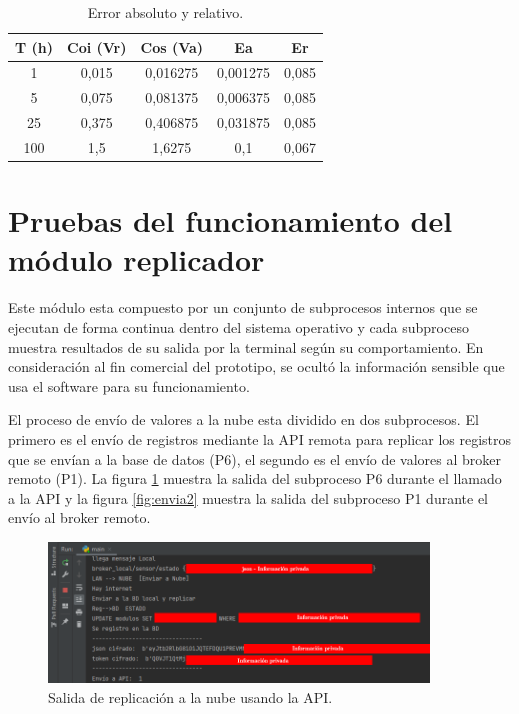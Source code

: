 \vspace{0.5cm}
\begin{table}[h]
	\centering
	\caption[Error absoluto y relativo]{Error absoluto y relativo.}
	\begin{tabular}{c c c c c}    
		\toprule
		\textbf{T (h)} & \textbf{Coi (Vr)} &\textbf{Cos (Va)} &\textbf{Ea} &\textbf{Er}\\
		\midrule
		1 & 0,015 & 0,016275 & 0,001275 & 0,085 \\		
		5 & 0,075 & 0,081375 & 0,006375 & 0,085 \\
		25 & 0,375 & 0,406875 & 0,031875 & 0,085\\		
		100 & 1,5 & 1,6275 & 0,1 & 0,067\\		
		
		\bottomrule
		\hline
	\end{tabular}
	\label{tab:tablaerror}
\end{table}

\section{Pruebas del funcionamiento del módulo replicador}

Este módulo esta compuesto por un conjunto de subprocesos internos que se ejecutan de forma continua dentro del sistema operativo y cada subproceso muestra resultados de su salida por la terminal según su comportamiento. En consideración al fin comercial del prototipo, se ocultó la información sensible que usa el software para su funcionamiento.

El proceso de envío de valores a la nube esta dividido en dos subprocesos. El primero es el envío de registros mediante la API remota para replicar los registros que se envían a la base de datos (P6), el segundo es el envío de valores al broker remoto (P1). La figura \ref{fig:envia1} muestra la salida del subproceso P6 durante el llamado a la API y la figura \ref{fig:envia2} muestra la salida del subproceso P1 durante el envío al broker remoto.

\begin{figure}[htpb]
\centering 
\includegraphics[width=0.9\textwidth]{./Figures/test/replicador/enviaAPI.png}
\caption{Salida de replicación a la nube usando la API.}
\label{fig:envia1}
\end{figure}

